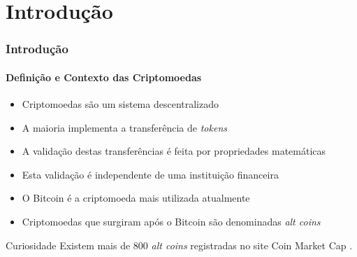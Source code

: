 \documentclass[aspectratio=169]{beamer}
\begin{document}
\section{Introdução}
\begin{frame}
\frametitle{Introdução}
\framesubtitle{Definição e Contexto das Criptomoedas}

\begin{itemize}
    \item Criptomoedas são um sistema descentralizado
        \cite{Prado2017}\pause
    
    \item A maioria implementa a transferência de \emph{tokens}\pause

    \item A validação destas transferências é feita por propriedades
        matemáticas \cite{LChicarino}\pause

    \item Esta validação é independente de uma instituição financeira
        \cite{Nakamoto2008}\pause

    \item O Bitcoin é a criptomoeda mais utilizada atualmente\pause

    \item Criptomoedas que surgiram após o Bitcoin são denominadas
        \emph{alt coins}
\end{itemize}

\pause

\begin{block}{Curiosidade}
    Existem mais de $800$ \emph{alt coins} registradas no site Coin
    Market Cap \cite{Arsov, CoinMarketCap2018}.
\end{block}

\end{frame}
\end{document}
